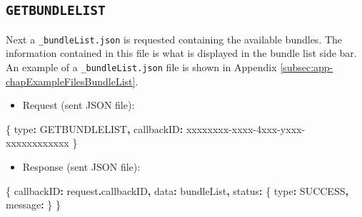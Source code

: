 \documentclass[
]{book}
\newenvironment{Shaded}{\begin{snugshade}}{\end{snugshade}}
\newcommand{\AttributeTok}[1]{\textcolor[rgb]{0.77,0.63,0.00}{#1}}
\newcommand{\NormalTok}[1]{#1}
\newcommand{\OperatorTok}[1]{\textcolor[rgb]{0.81,0.36,0.00}{\textbf{#1}}}
\newcommand{\StringTok}[1]{\textcolor[rgb]{0.31,0.60,0.02}{#1}}
\providecommand{\tightlist}{%
  \setlength{\itemsep}{0pt}\setlength{\parskip}{0pt}}
\begin{document}
\hypertarget{getbundlelist}{%
\subsection{\texorpdfstring{\texttt{GETBUNDLELIST}}{GETBUNDLELIST}}\label{getbundlelist}}

Next a \texttt{\_bundleList.json} is requested containing the available bundles. The information contained in this file is what is displayed in the bundle list side bar. An example of a \texttt{\_bundleList.json} file is shown in Appendix \ref{subsec:app-chapExampleFilesBundleList}.

\begin{itemize}
\tightlist
\item
  Request (sent JSON file):
\end{itemize}

\begin{Shaded}
\begin{Highlighting}[]
\NormalTok{\{}
  \StringTok{\textquotesingle{}type\textquotesingle{}}\OperatorTok{:} \StringTok{\textquotesingle{}GETBUNDLELIST\textquotesingle{}}\OperatorTok{,}
  \StringTok{\textquotesingle{}callbackID\textquotesingle{}}\OperatorTok{:} \StringTok{\textquotesingle{}xxxxxxxx{-}xxxx{-}4xxx{-}yxxx{-}xxxxxxxxxxxx\textquotesingle{}}
\NormalTok{\}}
\end{Highlighting}
\end{Shaded}

\begin{itemize}
\tightlist
\item
  Response (sent JSON file):
\end{itemize}

\begin{Shaded}
\begin{Highlighting}[]
\NormalTok{\{}
  \StringTok{\textquotesingle{}callbackID\textquotesingle{}}\OperatorTok{:}\NormalTok{ request}\OperatorTok{.}\AttributeTok{callbackID}\OperatorTok{,}
  \StringTok{\textquotesingle{}data\textquotesingle{}}\OperatorTok{:}\NormalTok{ bundleList}\OperatorTok{,}
  \StringTok{\textquotesingle{}status\textquotesingle{}}\OperatorTok{:}\NormalTok{ \{}
    \StringTok{\textquotesingle{}type\textquotesingle{}}\OperatorTok{:} \StringTok{\textquotesingle{}SUCCESS\textquotesingle{}}\OperatorTok{,}
    \StringTok{\textquotesingle{}message\textquotesingle{}}\OperatorTok{:} \StringTok{\textquotesingle{}\textquotesingle{}}
\NormalTok{  \}}
\NormalTok{\}}
\end{Highlighting}
\end{Shaded}
\end{document}

